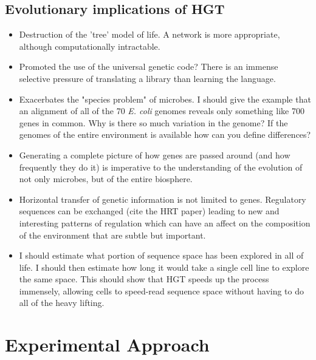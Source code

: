 \subsection*{Evolutionary implications of HGT}
\begin{itemize}
	\item Destruction of the 'tree' model of life. A network is more
		appropriate, although computationally intractable.
	\item Promoted the use of the universal genetic code? There is an
		immense selective pressure of translating a library than
		learning the language. 
	\item Exacerbates the "species problem" of microbes. I should give the
		example that an alignment of all of the 70 \textit{E. coli}
		genomes reveals only something like 700 genes in common. Why is
		there so much variation in the genome? If the genomes of the
		entire environment is available how can you define differences?
	\item Generating a complete picture of how genes are passed around (and
		how frequently they do it) is imperative to the understanding of
		the evolution of not only microbes, but of the entire biosphere. 
	\item Horizontal transfer of genetic information is not limited to
		genes. Regulatory sequences can be exchanged (cite the HRT
		paper) leading to new and interesting patterns of regulation
		which can have an affect on the composition of the environment
		that are subtle but important.
	\item I should estimate what portion of sequence space has been explored
		in all of life. I should then estimate how long it would take a
		single cell line to explore the same space. This should show
		that HGT speeds up the process immensely, allowing cells to
		speed-read sequence space without having to do all  of the heavy
		lifting.
\end{itemize}
\section*{Experimental Approach}
